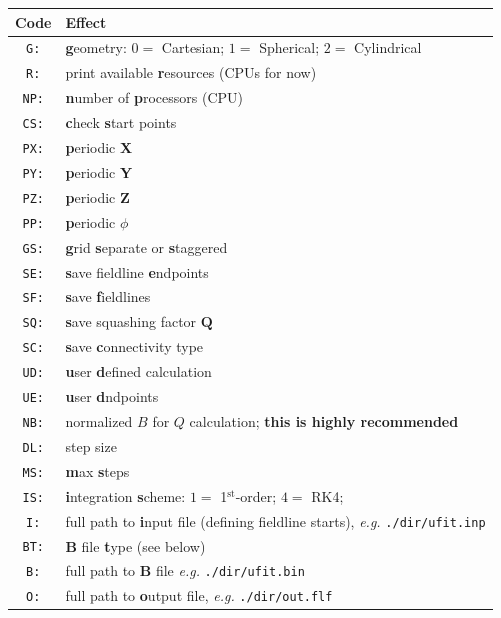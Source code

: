 \documentclass[12pt,twoside]{article}
\begin{document}
\begin{tabular}{|c|l|}		
		\hline
		\textbf{Code} & \textbf{Effect} \\\hline\hline
		\texttt{G:} & \textbf{g}eometry: $0 =$ Cartesian; $1 =$ Spherical; $2 =$ Cylindrical  \\\hline
		\texttt{R:} & print available \textbf{r}esources (CPUs for now) \\\hline
		\texttt{NP:} &  \textbf{n}umber of \textbf{p}rocessors (CPU) \\\hline
		\texttt{CS:} & \textbf{c}heck \textbf{s}tart points \\\hline
		\texttt{PX:} & \textbf{p}eriodic \textbf{X} \\\hline
		\texttt{PY:} & \textbf{p}eriodic \textbf{Y}  \\\hline
		\texttt{PZ:} & \textbf{p}eriodic \textbf{Z}  \\\hline
		\texttt{PP:} & \textbf{p}eriodic $\phi$  \\\hline
		\texttt{GS:} & \textbf{g}rid \textbf{s}eparate or \textbf{s}taggered  \\\hline
		\texttt{SE:} & \textbf{s}ave fieldline \textbf{e}ndpoints \\\hline
		\texttt{SF:} & \textbf{s}ave \textbf{f}ieldlines \\\hline
		\texttt{SQ:} & \textbf{s}ave squashing factor $\mathbf{Q}$  \\\hline
		\texttt{SC:} & \textbf{s}ave \textbf{c}onnectivity type  \\\hline
		\texttt{UD:} & \textbf{u}ser \textbf{d}efined calculation  \\\hline
		\texttt{UE:} & \textbf{u}ser \textbf{d}ndpoints  \\\hline
		\texttt{NB:} & normalized $B$ for $Q$ calculation; \textbf{this is highly recommended} \\\hline
		\texttt{DL:} & step size \\\hline
		\texttt{MS:} & \textbf{m}ax \textbf{s}teps  \\\hline
		\texttt{IS:} & \textbf{i}ntegration \textbf{s}cheme: $1 =$ 1$^{\mathrm{st}}$-order; $4 =$ RK4; \\\hline
		\texttt{I:} & full path to \textbf{i}nput file (defining fieldline starts), \textit{e.g.} \texttt{./dir/ufit.inp} \\\hline
		\texttt{BT:} & $\mathbf{B}$ file \textbf{t}ype (see below) \\\hline
		\texttt{B:} & full path to $\mathbf{B}$ file \textit{e.g.} \texttt{./dir/ufit.bin} \\\hline
		\texttt{O:} & full path to \textbf{o}utput file, \textit{e.g.} \texttt{./dir/out.flf} \\\hline

\end{tabular}
\end{document}
